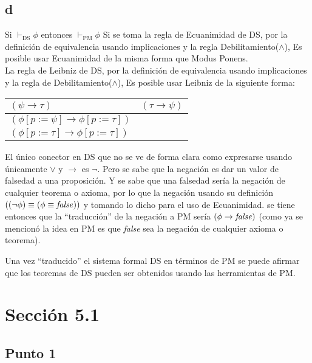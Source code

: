 \documentclass{article}
\newcommand{\q}[1]{``#1''}
\begin{document}
\subsection{d}
\begin{logicenv}[5]{Si $\vdash_{\text{DS}}\phi$ entonces $\vdash_{\text{PM}} \phi$}
    Si se toma la regla de Ecuanimidad de DS, por la definición de equivalencia usando implicaciones y la regla Debilitamiento($\land$), Es posible usar Ecuanimidad de la misma forma que Modus Ponens.\\
    La regla de Leibniz de DS, por la definición de equivalencia usando implicaciones y la regla de Debilitamiento($\land$), Es posible usar Leibniz de la siguiente forma:
    \begin{center}
        \begin{NiceTabular}{l r}
            $(\psi \to \tau)$ & \hspace*{-2cm}$(\tau \to \psi)$\\
            \hline
            \hspace*{.5cm}$(\phi[p:= \psi] \to \phi[p:= \tau])$\\
            \hspace*{.5cm}$(\phi[p:= \tau] \to \phi[p:= \tau])$
        \end{NiceTabular}
    \end{center}
    El único conector en DS que no se ve de forma clara como expresarse usando únicamente  $\lor$ y $\to$ es $\neg$. Pero se sabe que la negación es dar un valor de falsedad a una proposición. Y se sabe que una falsedad sería la negación de cualquier teorema o axioma, por lo que la negación usando su definición $((\neg \phi) \equiv (\phi \equiv \textrm{\textit{false}}))$ y tomando lo dicho para el uso de Ecuanimidad. se tiene entonces que la \q{traducción} de la negación a PM sería $(\phi \to \textrm{\textit{false}})$ (como ya se mencionó la idea en PM es que \textit{false} sea la negación de cualquier axioma o teorema).

    Una vez \q{traducido} el sistema formal DS en términos de PM se puede afirmar que los teoremas de DS pueden ser obtenidos usando las herramientas de PM.
\end{logicenv}

\section{Sección 5.1}
\subsection{Punto 1}
\end{document}

